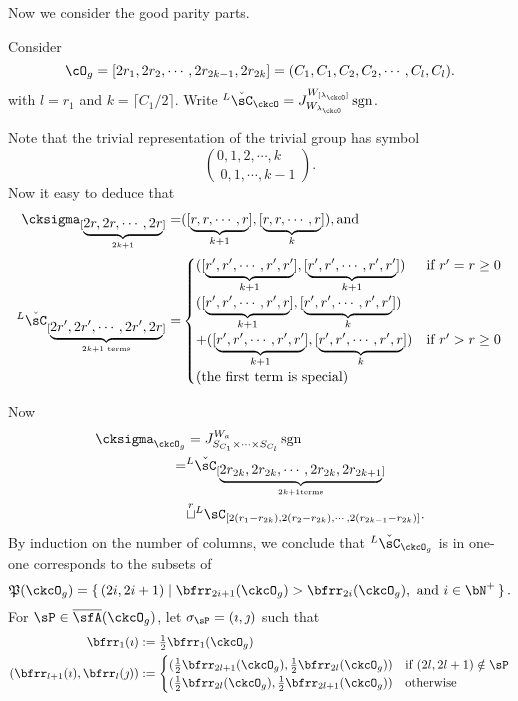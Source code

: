 \documentclass[12pt,a4paper]{amsart}
\newcommand{\CQ}{{\mathcal {Q}}}
\newcommand{\sgn}{\operatorname{sgn}}
\numberwithin{equation}{section}
\theoremstyle{remark}
\def\half{{\tfrac{1}{2}}}
\def\floor#1{{\lfloor #1 \rfloor}}
\def\lamck{\lambda_\ckcO}
\def\LC{{}^L\sC}
\def\ckLC{{}^L\check{\sC}}
\def\cuprow{{\stackrel{r}{\sqcup}}}
\def\CQ{\overline{\sfA}}%
\def\CPP{\mathfrak{P}}
\def\ceil#1{\lceil #1 \rceil}
\begin{document}
{Now we consider the good parity parts.


Consider
\[
\cO_{g} = [2r_{1},2r_{2}, \cdots, 2r_{2k-1},2r_{2k}]
= (C_{1},C_{1}, C_{2},C_{2},\cdots, C_{l}, C_{l}).
\]
with $l = r_{1}$ and $k = \ceil{C_{1}/2}$.
Write  $\ckLC_{\ckcO} = J_{W_{\lamck}}^{W_{[\lamck]}}\sgn$.



Note that the trivial representation of the trivial group has symbol
\[
\binom{0,1, 2, \cdots, k\phantom{-1}}{0,1, \cdots, k-1}.
\]
Now it easy to deduce that
\[
\begin{split}
\cksigma_{[\underbrace{2r,2r, \cdots, 2r}_{2k+1}]}
=& ([\underbrace{r,r, \cdots, r}_{k+1}], [\underbrace{r,r, \cdots, r}_{k}]),
\text{and}\\
\ckLC_{[\underbrace{2r',2r', \cdots, 2r',2r}_{2k+1\text{ terms}}]}
=&
\begin{cases}
  ([\underbrace{r',r', \cdots, r',r'}_{k+1}], [\underbrace{r',r', \cdots, r',r'}_{k+1}]) &
  \text{if } r'=r\geq 0 \\
  ([\underbrace{r',r', \cdots, r',r}_{k+1}], [\underbrace{r',r', \cdots, r',r'}_{k}]) &\\
 +([\underbrace{r',r', \cdots, r',r'}_{k+1}], [\underbrace{r',r', \cdots, r',r}_{k}]) &
  \text{if } r'>r \geq 0\\
 \text{(the first term is special)}& \\
\end{cases}
\end{split}
\]

Now
\[
  \begin{split}
    \cksigma_{\ckcO_{g}} & =
    J_{S_{C_{1}}\times \cdots \times S_{C_{l}}}^{W_{a}} \sgn\\
    =& \ckLC_{[\underbrace{2r_{2k},2r_{2k}, \cdots,2r_{2k},2r_{2k+1}}_{2k+1\text{terms}}]}\\
    & \cuprow \LC_{[2(r_{1}-r_{2k}), 2(r_{2}-r_{2k}), \cdots, 2(r_{2k-1}-r_{2k})]}.
  \end{split}
\]
By induction on the number of columns, we conclude that $\ckLC_{\ckcO_{g}}$ is in one-one corresponds to
the subsets of
\[
\CPP(\ckcO_{g}) = \set{(2i,2i+1)| \bfrr_{2i+1}(\ckcO_{g})> \bfrr_{2i}(\ckcO_{g}), \text{ and
  } i\in \bN^{+}}.
\]
For $\sP\in \CQ(\ckcO_{g})$, let $\sigma_{\sP} = (\imath,\jmath)$
such that
\[
\begin{split}
  \bfrr_{1}(\imath) &:= \half \bfrr_{1}(\ckcO_{g})\\
  (\bfrr_{l+1}(\imath), \bfrr_{l}(\jmath))&:=
  \begin{cases}
    (\half \bfrr_{2l+1}(\ckcO_{g}), \half \bfrr_{2l}(\ckcO_{g}))
    & \text{if } (2l,2l+1)\notin \sP\\
    (\half \bfrr_{2l}(\ckcO_{g}), \half \bfrr_{2l+1}(\ckcO_{g}))
    & \text{otherwise}
  \end{cases}
\end{split}
\]


}
\end{document}
